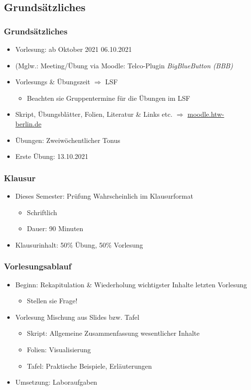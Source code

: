 \documentclass[xcolor=dvipsnames,aspectratio=169]{beamer}
\begin{document}
\subsection{Grundsätzliches}
\begin{frame}
	\frametitle{Grundsätzliches}
	\begin{itemize}
		\item Vorlesung: ab Oktober 2021 06.10.2021
		\item (Mglw.: Meeting/Übung via Moodle: Telco-Plugin \emph{BigBlueButton (BBB)}
		\item Vorlesungs \& Übungszeit $\Rightarrow$ LSF
		\begin{itemize}
			\item Beachten sie Gruppentermine für die Übungen im LSF
		\end{itemize}
		\item Skript, Übungsblätter, Folien, Literatur \& Links etc. $\Rightarrow$ \url{moodle.htw-berlin.de}
		\item Übungen: Zweiwöchentlicher Tonus 
		\item Erste Übung: 13.10.2021
	\end{itemize}
\end{frame}

\begin{frame}
	\frametitle{Klausur}
		\begin{itemize}
			\item Dieses Semester: Prüfung Wahrscheinlich im Klausurformat	
			\begin{itemize}
				\item Schriftlich
				\item Dauer: 90 Minuten
			\end{itemize}
			\item Klausurinhalt: 50\% Übung, 50\% Vorlesung
		\end{itemize}
\end{frame}

\begin{frame}
	\frametitle{Vorlesungsablauf}
	\begin{itemize}
		\item Beginn: Re­ka­pi­tu­la­ti­on \& Wiederholung wichtigster Inhalte letzten Vorlesung
		\begin{itemize}
			\item Stellen sie Frage!
		\end{itemize}
		\item Vorlesung Mischung aus Slides bzw. Tafel
		\begin{itemize}
			\item Skript: Allgemeine Zusammenfassung wesentlicher Inhalte
			\item Folien: Visualisierung
			\item Tafel: Praktische Beispiele, Erläuterungen
		\end{itemize}
		\item Umsetzung: Laboraufgaben
	\end{itemize}
\end{frame}
\end{document}
